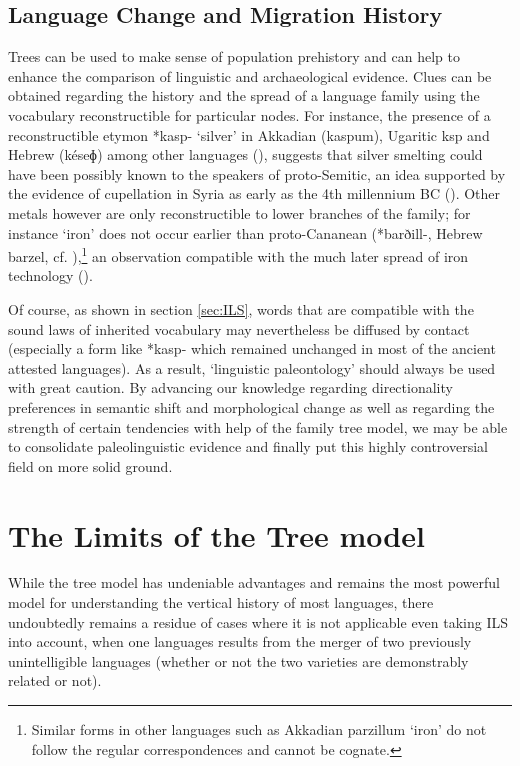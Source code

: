 \documentclass[svgnames,12pt]{scrartcl}
\newcommand{\ipa}[1]{{{\phon\mbox{#1}}}}
\begin{document}
{{\subsection{Language Change and Migration History}
Trees can be used to make sense of population prehistory and can help to enhance the comparison of
linguistic and archaeological evidence. Clues can be obtained regarding the history and the spread
of a language family using the vocabulary reconstructible for particular nodes. 
For instance, the presence of a reconstructible etymon *\ipa{kasp-}  `silver'  in Akkadian (\ipa{kaspum}), Ugaritic \ipa{ksp} and Hebrew (\ipa{késeɸ}) among other languages (\citealt[14-6]{huehnergard12ugaritic}), suggests that silver smelting could have been possibly known to the speakers of proto-Semitic, an idea supported by the evidence of cupellation in Syria as early as the 4th millennium BC  (\citealt{pernicka98silver}). 
Other metals however are only reconstructible to lower branches of the family; for instance `iron'
does not occur earlier than proto-Cananean (*\ipa{barðill-}, Hebrew \ipa{barzel}, cf.
\citealt[287]{kogan15semitic}),\footnote{Similar forms in other languages such as Akkadian
\ipa{parzillum} `iron' do not follow the regular correspondences and cannot be cognate.} an observation compatible with the much later spread of iron technology (\citealt{yahalom15iron}).
 
Of course, as shown in section \ref{sec:ILS}, words that are compatible with the sound laws of
inherited vocabulary may nevertheless be diffused by contact (especially a form like *\ipa{kasp-}
which remained unchanged in most of the ancient attested languages). As a result, `linguistic
paleontology' should always be used with great caution. By advancing our knowledge regarding
directionality preferences in semantic shift and morphological change as well as regarding the
strength of certain tendencies with help of the family tree model, we may be able to consolidate
paleolinguistic evidence and finally put this highly controversial field on more solid ground.



\section{The Limits of the Tree model} \label{sec:limits}
While the tree model has undeniable advantages and remains the most powerful model for understanding the vertical history of most languages, there undoubtedly remains a residue of cases where it is not applicable even taking ILS into account, when one languages results from the merger of two previously unintelligible languages (whether or not the two varieties are demonstrably related or not).

}}
\end{document}
